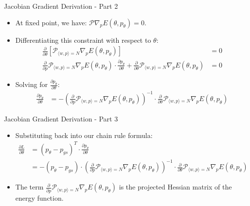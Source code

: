 \documentclass{beamer}
\begin{document}
\begin{frame}{Jacobian Gradient Derivation - Part 2}
  \begin{itemize}
    \item At fixed point, we have: $\mathcal{P}\nabla_p E(\theta, p_{\theta}) = 0$.
    \item Differentiating this constraint with respect to $\theta$:
    \begin{align}
      \frac{\partial}{\partial \theta}\left[\mathcal{P}_{\langle w,p \rangle = N}\nabla_p E(\theta, p_{\theta})\right] &= 0 \\
      \frac{\partial}{\partial p}\mathcal{P}_{\langle w,p \rangle = N}\nabla_p E(\theta, p_{\theta}) \cdot \frac{\partial p_{\theta}}{\partial \theta} + \frac{\partial}{\partial \theta}\mathcal{P}_{\langle w,p \rangle = N}\nabla_p E(\theta, p_{\theta}) &= 0
    \end{align}
    \item Solving for $\frac{\partial p_{\theta}}{\partial \theta}$:
    \begin{align}
      \frac{\partial p_{\theta}}{\partial \theta} &= -\left(\frac{\partial}{\partial p}\mathcal{P}_{\langle w,p \rangle = N}\nabla_p E(\theta, p_{\theta})\right)^{-1} \cdot \frac{\partial}{\partial \theta}\mathcal{P}_{\langle w,p \rangle = N}\nabla_p E(\theta, p_{\theta})
    \end{align}
  \end{itemize}
\end{frame}

\begin{frame}{Jacobian Gradient Derivation - Part 3}
  \begin{itemize}
    \item Substituting back into our chain rule formula:
    \begin{align}
      \frac{\partial L}{\partial \theta} &= (p_{\theta} - p_{gs})^T \cdot \frac{\partial p_{\theta}}{\partial \theta} \\
      &= -(p_{\theta} - p_{gs}) \cdot \left(\frac{\partial}{\partial p}\mathcal{P}_{\langle w,p \rangle = N}\nabla_p E(\theta, p_{\theta})\right)^{-1} \cdot \frac{\partial}{\partial \theta}\mathcal{P}_{\langle w,p \rangle = N}\nabla_p E(\theta, p_{\theta})
    \end{align}
    \item The term $\frac{\partial}{\partial p}\mathcal{P}_{\langle w,p \rangle = N}\nabla_p E(\theta, p_{\theta})$ is the projected Hessian matrix of the energy function.
  \end{itemize}
\end{frame}
\end{document}
